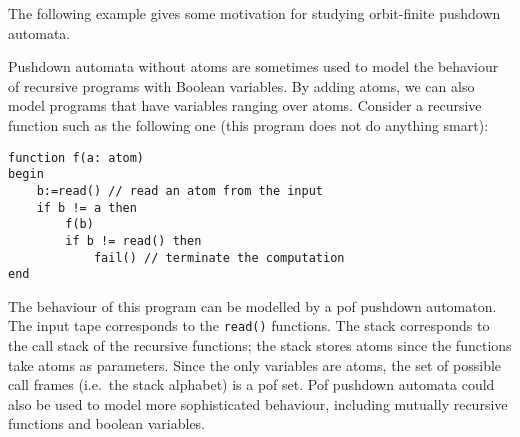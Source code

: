 	The following example gives some motivation for studying orbit-finite pushdown automata.
		\begin{myexample} \label{example:model-recursive-programs}
		Pushdown automata without atoms are sometimes used to model the behaviour of recursive  programs with Boolean variables. By adding atoms,  
	we can also model programs that have variables ranging over atoms. 	Consider  a recursive function such as the following one (this program does not do anything smart):





\begin{lstlisting}
function f(a: atom)
begin 
	b:=read() // read an atom from the input
	if b != a then
		f(b)
		if b != read() then 
			fail() // terminate the computation
end
\end{lstlisting}
	The behaviour of this program can be modelled by a pof pushdown automaton. The input tape corresponds to the {\tt read()} functions. The stack corresponds to the call stack of the recursive functions; the stack stores atoms since the functions take atoms as parameters. Since the only variables are atoms, the set of possible call frames (i.e.~the stack alphabet) is a pof set. Pof 
 pushdown automata could also be used to model more sophisticated behaviour, including mutually recursive functions and boolean variables. 
	\end{myexample}



